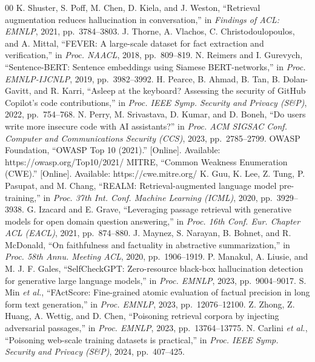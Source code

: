 \begin{thebibliography}{00}
 K. Shuster, S. Poff, M. Chen, D. Kiela, and J. Weston, ``Retrieval augmentation reduces hallucination in conversation,'' in \emph{Findings of ACL: EMNLP}, 2021, pp.~3784--3803.
 J. Thorne, A. Vlachos, C. Christodoulopoulos, and A. Mittal, ``FEVER: A large-scale dataset for fact extraction and verification,'' in \emph{Proc. NAACL}, 2018, pp.~809--819.
 N. Reimers and I. Gurevych, ``Sentence-BERT: Sentence embeddings using Siamese BERT-networks,'' in \emph{Proc. EMNLP-IJCNLP}, 2019, pp.~3982--3992.
 H. Pearce, B. Ahmad, B. Tan, B. Dolan-Gavitt, and R. Karri, ``Asleep at the keyboard? Assessing the security of GitHub Copilot's code contributions,'' in \emph{Proc. IEEE Symp. Security and Privacy (S\&P)}, 2022, pp.~754--768.
 N. Perry, M. Srivastava, D. Kumar, and D. Boneh, ``Do users write more insecure code with AI assistants?'' in \emph{Proc. ACM SIGSAC Conf. Computer and Communications Security (CCS)}, 2023, pp.~2785--2799.
 OWASP Foundation, ``OWASP Top 10 (2021).'' [Online]. Available: https://owasp.org/Top10/2021/
 MITRE, ``Common Weakness Enumeration (CWE).'' [Online]. Available: https://cwe.mitre.org/
 K. Guu, K. Lee, Z. Tung, P. Pasupat, and M. Chang, ``REALM: Retrieval-augmented language model pre-training,'' in \emph{Proc. 37th Int. Conf. Machine Learning (ICML)}, 2020, pp.~3929--3938.
 G. Izacard and E. Grave, ``Leveraging passage retrieval with generative models for open domain question answering,'' in \emph{Proc. 16th Conf. Eur. Chapter ACL (EACL)}, 2021, pp.~874--880.
 J. Maynez, S. Narayan, B. Bohnet, and R. McDonald, ``On faithfulness and factuality in abstractive summarization,'' in \emph{Proc. 58th Annu. Meeting ACL}, 2020, pp.~1906--1919.
 P. Manakul, A. Liusie, and M. J. F. Gales, ``SelfCheckGPT: Zero-resource black-box hallucination detection for generative large language models,'' in \emph{Proc. EMNLP}, 2023, pp.~9004--9017.
 S. Min \emph{et al.}, ``FActScore: Fine-grained atomic evaluation of factual precision in long form text generation,'' in \emph{Proc. EMNLP}, 2023, pp.~12076--12100.
 Z. Zhong, Z. Huang, A. Wettig, and D. Chen, ``Poisoning retrieval corpora by injecting adversarial passages,'' in \emph{Proc. EMNLP}, 2023, pp.~13764--13775.
 N. Carlini \emph{et al.}, ``Poisoning web-scale training datasets is practical,'' in \emph{Proc. IEEE Symp. Security and Privacy (S\&P)}, 2024, pp.~407--425.

\end{thebibliography}
